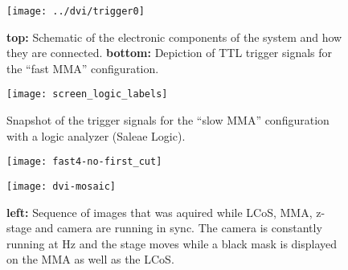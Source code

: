 \begin{figure}[!hbt]
  \centering
  \texttt{[image: ../dvi/trigger0]}
  \caption{{\bf top:} Schematic of the electronic components of the
    system and how they are connected. {\bf bottom:} Depiction of TTL
    trigger signals for the ``fast MMA'' configuration.}
  \label{fig:trigger0}
\end{figure}


\begin{figure}[!hbt]
  \centering
  \texttt{[image: screen\_logic\_labels]}
  \caption{Snapshot of the trigger signals for the ``slow MMA''
    configuration with a logic analyzer (Saleae Logic).}
  \label{fig:screen_logic_labels}
\end{figure}

\begin{figure}[!hbt]
  \centering
  \texttt{[image: fast4-no-first\_cut]}
  \caption{}
  \label{fig:fast4-no-first_cut}
\end{figure}


\begin{figure}[!hbt]
  \centering
  \texttt{[image: dvi-mosaic]}
  \caption{{\bf left:} Sequence of images that was aquired while LCoS,
    MMA, z-stage and camera are running in sync. The camera is
    constantly running at \unit[30]{Hz} and the stage moves while a
    black mask is displayed on the MMA as well as the LCoS.}
  \label{fig:dvi-mosaic}
\end{figure}

